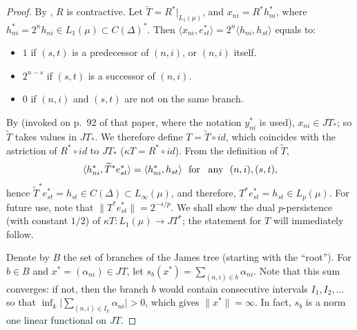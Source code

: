 \documentclass{amsart}
\theoremstyle{plain}
\theoremstyle{definition}
\numberwithin{equation}{section}
\newcommand{\vr}{\varepsilon}
\begin{document}
\begin{proof}
By \cite[p.~92]{LiSt}, $R$ is contractive. Let $\widetilde{T} = R^*\big|_{L_1(\mu)}$, and $x_{ni} = R^* h_{ni}^*$, where $h_{ni}^* = 2^n h_{ni} \in L_1(\mu) \subset C(\Delta)^*$.
Then $\langle x_{ni} , e^*_{st} \rangle = 2^n \langle h_{ni} , h_{st} \rangle$ equals to:
	\begin{itemize}
		\item $1$ if $(s,t)$ is a predecessor of $(n,i)$, or $(n,i)$ itself.
		\item $2^{n-s}$ if $(s,t)$ is a successor of $(n,i)$.
		\item $0$ if $(n,i)$ and $(s,t)$ are not on the same branch.
	\end{itemize}
By \cite[Theorem 1]{LiSt} (invoked on p.~92 of that paper, where the notation $y^*_{ni}$ is used), $x_{ni} \in JT_*$; so $\widetilde{T}$ takes values in $JT_*$.
We therefore define $T = \widetilde{T} \circ id$, which coincides with the astriction of $R^* \circ id$ to $JT_*$ ($\kappa T = R^* \circ id$). From the definition of $\widetilde{T}$, 
$$
\langle h_{ni}^* , \widetilde{T}^* e^*_{st} \rangle = \langle h_{ni}^* , h_{st} \rangle \, \, {\textrm{ for \,  any }}  \, \, (n,i) , (s,t) ,
$$
hence $\widetilde{T}^* e^*_{st} = h_{st} \in C(\Delta) \subset L_\infty(\mu)$, and therefore, $T^* e^*_{st} = h_{st} \in L_p(\mu)$. For future use, note that $\|T^* e^*_{st}\| = 2^{-s/p}$.
We shall show the dual $p$-persistence (with constant $1/2$) of $\kappa T : L_1(\mu) \to JT^*$; the statement for $T$ will immediately follow. 

Denote by $B$ the set of branches of the James tree (starting with the ``root''). For $b \in B$ and $x^* = (\alpha_{ni}) \in JT$, let $s_b(x^*) = \sum_{(n,i) \in b} \alpha_{ni}$. Note that this sum converges: if not, then the branch $b$ would contain consecutive intervals $I_1, I_2, \ldots$ so that $\inf_k \big| \sum_{(n,i) \in I_k} \alpha_{ni} \big| > 0$, which gives $\|x^*\| = \infty$. In fact, $s_b$ is a norm one linear functional on $JT$.


\end{proof}
\end{document}
